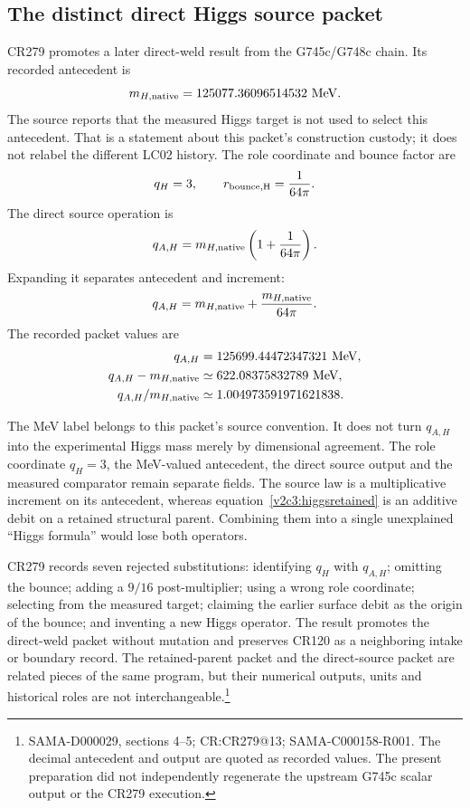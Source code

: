 \subsection{The distinct direct Higgs source packet}

CR279 promotes a later direct-weld result from the G745c/G748c chain. Its recorded antecedent is
\begin{equation}
m_{H,\rm native}=125077.36096514532\ \mathrm{MeV}.
\end{equation}
The source reports that the measured Higgs target is not used to select this antecedent. That is a statement about this packet's construction custody; it does not relabel the different LC02 history. The role coordinate and bounce factor are
\begin{equation}
q_H=3,\qquad r_{\rm bounce,H}=\frac1{64\pi}.
\end{equation}
The direct source operation is
\begin{equation}
q_{A,H}=m_{H,\rm native}\left(1+\frac1{64\pi}\right).
\label{v2c3:higgsdirect}
\end{equation}
Expanding it separates antecedent and increment:
\begin{equation}
q_{A,H}=m_{H,\rm native}+\frac{m_{H,\rm native}}{64\pi}.
\end{equation}
The recorded packet values are
\begin{align}
q_{A,H}&=125699.44472347321\ \mathrm{MeV},\\
q_{A,H}-m_{H,\rm native}&\simeq622.08375832789\ \mathrm{MeV},\\
q_{A,H}/m_{H,\rm native}&\simeq1.004973591971621838.
\end{align}

The MeV label belongs to this packet's source convention. It does not turn $q_{A,H}$ into the experimental Higgs mass merely by dimensional agreement. The role coordinate $q_H=3$, the MeV-valued antecedent, the direct source output and the measured comparator remain separate fields. The source law is a multiplicative increment on its antecedent, whereas equation~\eqref{v2c3:higgsretained} is an additive debit on a retained structural parent. Combining them into a single unexplained ``Higgs formula'' would lose both operators.

CR279 records seven rejected substitutions: identifying $q_H$ with $q_{A,H}$; omitting the bounce; adding a $9/16$ post-multiplier; using a wrong role coordinate; selecting from the measured target; claiming the earlier surface debit as the origin of the bounce; and inventing a new Higgs operator. The result promotes the direct-weld packet without mutation and preserves CR120 as a neighboring intake or boundary record. The retained-parent packet and the direct-source packet are related pieces of the same program, but their numerical outputs, units and historical roles are not interchangeable.\footnote{SAMA-D000029, sections 4--5; CR:CR279@13; SAMA-C000158-R001. The decimal antecedent and output are quoted as recorded values. The present preparation did not independently regenerate the upstream G745c scalar output or the CR279 execution.}

